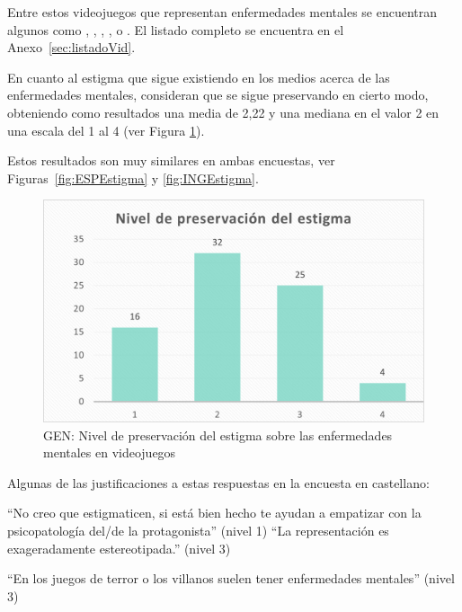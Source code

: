 \documentclass[12pt, a4paper,twoside,titlepage]{book}
\newcommand{\comm}[1]{\todo[linecolor=yellow]{\textsf{#1}}}
\begin{document}
Entre estos videojuegos que representan enfermedades mentales se encuentran algunos como , , , ,  o . El listado completo se encuentra en el Anexo~\ref{sec:listadoVid}.
   
En cuanto al estigma que sigue existiendo en los medios acerca de las enfermedades mentales, consideran que se sigue preservando en cierto modo, obteniendo como resultados una media de 2,22 y una mediana en el valor 2 en una escala del 1 al 4 (ver Figura \ref{fig:Estigma}). 


Estos resultados son muy similares en ambas encuestas, ver Figuras~\ref{fig:ESPEstigma} y \ref{fig:INGEstigma}.  



\begin{figure}
\centering
 \includegraphics[width=.8\linewidth]{Imagenes Form GEN/9GENEstg}
 \caption{GEN: Nivel de preservación del estigma sobre las enfermedades mentales en videojuegos}
 \label{fig:Estigma}
 \end{figure}
 
Algunas de las justificaciones a estas respuestas en la encuesta en castellano:

``No creo que estigmaticen, si está bien hecho te ayudan a empatizar con la psicopatología del/de la protagonista'' (nivel 1)
``La representación es exageradamente estereotipada.'' (nivel 3) 

``En los juegos de terror o los villanos suelen tener enfermedades mentales'' (nivel 3)
\end{document}

